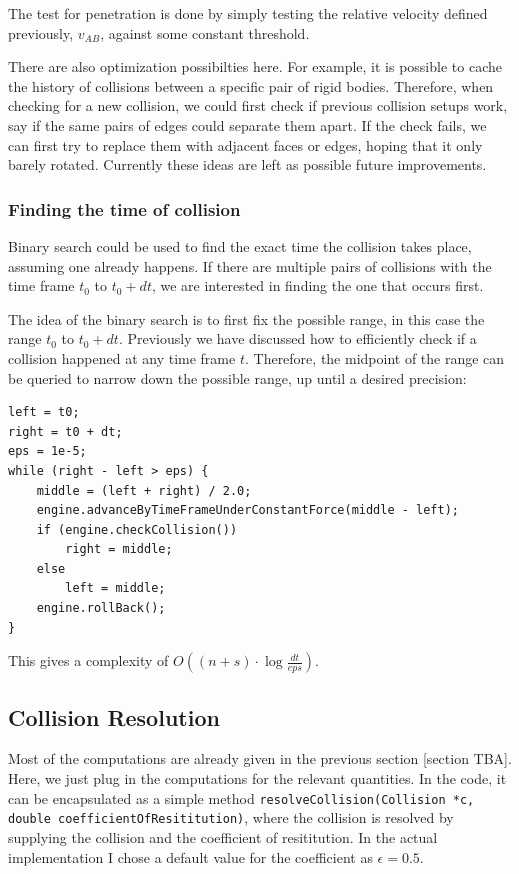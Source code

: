 \documentclass[12pt,a4paper,twoside,openright]{report}
\newcommand{\code}{\texttt}
\begin{document}
The test for penetration is done by simply testing the relative velocity defined previously, $v_{AB}$, against some constant threshold.

There are also optimization possibilties here. For example, it is possible to cache the history of collisions between a specific pair of rigid bodies. Therefore, when checking for a new collision, we could first check if previous collision setups work, say if the same pairs of edges could separate them apart. If the check fails, we can first try to replace them with adjacent faces or edges, hoping that it only barely rotated. Currently these ideas are left as possible future improvements.

\subsubsection{Finding the time of collision}

Binary search could be used to find the exact time the collision takes place, assuming one already happens. If there are multiple pairs of collisions with the time frame $t_0$ to $t_0 + dt$, we are interested in finding the one that occurs first.

The idea of the binary search is to first fix the possible range, in this case the range $t_0$ to $t_0 + dt$. Previously we have discussed how to efficiently check if a collision happened at any time frame $t$. Therefore, the midpoint of the range can be queried to narrow down the possible range, up until a desired precision:

\begin{verbatim}
left = t0;
right = t0 + dt;
eps = 1e-5;
while (right - left > eps) {
    middle = (left + right) / 2.0;
    engine.advanceByTimeFrameUnderConstantForce(middle - left);
    if (engine.checkCollision())
        right = middle;
    else
        left = middle;
    engine.rollBack();
}
\end{verbatim}

This gives a complexity of $O((n + s) \cdot \log \frac{dt}{eps})$.

\subsection{Collision Resolution}

Most of the computations are already given in the previous section [section TBA]. Here, we just plug in the computations for the relevant quantities. In the code, it can be encapsulated as a simple method \code{resolveCollision(Collision *c, double coefficientOfResititution)}, where the collision is resolved by supplying the collision and the coefficient of resititution. 
In the actual implementation I chose a default value for the coefficient as $\epsilon = 0.5$. 
\end{document}
